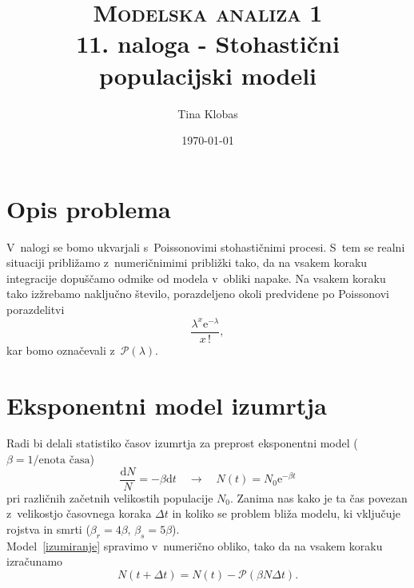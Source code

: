 \documentclass[a4paper,pdftex,11pt]{article}
\title{	
\normalfont \normalsize 
\textsc{Modelska analiza 1} \\ [25pt] %
\huge 11. naloga - Stohastični populacijski modeli\\ %
}
\author{Tina Klobas} %
\date{\normalsize\today} %
\numberwithin{figure}{section} %
\begin{document}
\maketitle %

\section{Opis problema}
V~nalogi se bomo ukvarjali s~Poissonovimi stohastičnimi procesi. S~tem se realni situaciji
približamo z~numeričnimimi približki tako, da na vsakem koraku integracije dopuščamo 
odmike od modela v~obliki napake. Na vsakem koraku tako izžrebamo naključno število, 
porazdeljeno okoli predvidene po Poissonovi porazdelitvi
\begin{equation}
    \frac{\lambda^x \mathrm{e}^{-\lambda}}{x \, !},
\end{equation}
kar bomo označevali z~$\mathcal{P}(\lambda)$.
\section{Eksponentni model izumrtja}
Radi bi delali statistiko časov izumrtja za preprost eksponentni model ($\beta = 
1/\text{enota časa}$)
\begin{equation} \label{izumiranje}
    \frac{\mathrm{d} N }{N} = - \beta \mathrm{d}t \quad \rightarrow \quad
    N(t) = N_0 \mathrm{e}^{-\beta t}
\end{equation}
pri različnih začetnih velikostih populacije $N_0$. Zanima nas kako je ta čas povezan
z~velikostjo časovnega koraka $\Delta t$ in koliko se problem bliža modelu, ki vključuje
rojstva in smrti ($\beta_r =4\beta, \, \beta_s = 5\beta$).\\
Model~\ref{izumiranje} spravimo v~numerično obliko, tako da na vsakem koraku izračunamo
\begin{equation}
    N ( t+ \Delta t) = N(t) - \mathcal{P}(\beta N \Delta t).
\end{equation}
\end{document}
